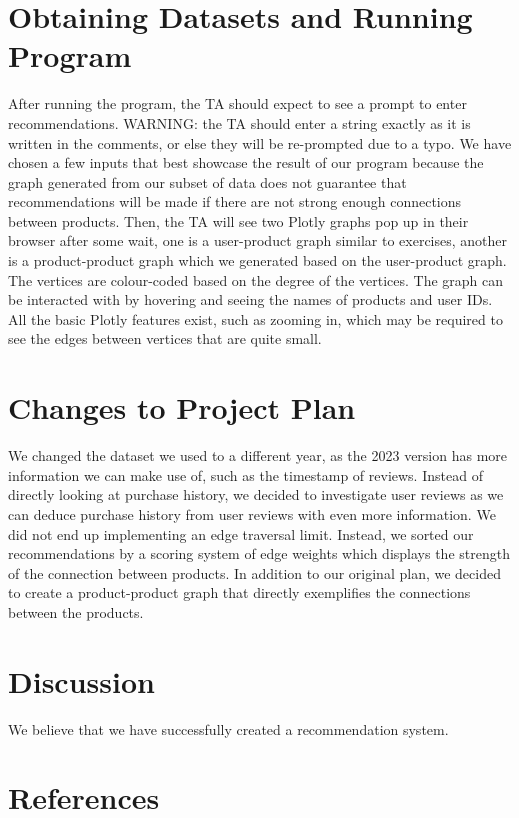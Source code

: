 \documentclass[fontsize=11pt]{article}
\begin{document}
\section*{Obtaining Datasets and Running Program}
After running the program, the TA should expect to see a prompt to enter recommendations.
WARNING: the TA should enter a string exactly as it is written in the comments, or else they will be re-prompted due to a typo. We have chosen a few inputs that best showcase the result of our program because the graph generated from our subset of data does not guarantee that recommendations will be made if there are not strong enough connections between products.
Then, the TA will see two Plotly graphs pop up in their browser after some wait, one is a user-product graph similar to exercises, another is a product-product graph which we generated based on the user-product graph. The vertices are colour-coded based on the degree of the vertices. The graph can be interacted with by hovering and seeing the names of products and user IDs. All the basic Plotly features exist, such as zooming in, which may be required to see the edges between vertices that are quite small.

\section*{Changes to Project Plan}
We changed the dataset we used to a different year, as the 2023 version has more information we can make use of, such as the timestamp of reviews. Instead of directly looking at purchase history, we decided to investigate user reviews as we can deduce purchase history from user reviews with even more information. We did not end up implementing an edge traversal limit. Instead, we sorted our recommendations by a scoring system of edge weights which displays the strength of the connection between products. In addition to our original plan, we decided to create a product-product graph that directly exemplifies the connections between the products. 

\section*{Discussion}
We believe that we have successfully created a recommendation system. 

\section*{References}
\end{document}
